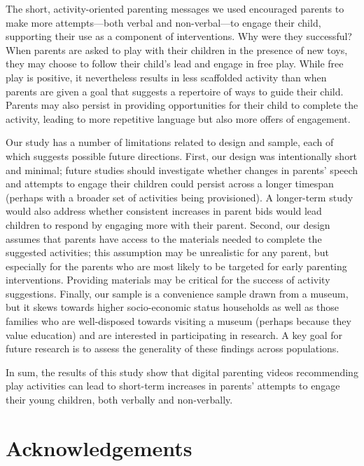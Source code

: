 \documentclass[man,floatsintext]{apa6}
\begin{document}
The short, activity-oriented parenting messages we used encouraged parents to make more attempts---both verbal and non-verbal---to engage their child, supporting their use as a component of interventions.
Why were they successful?
When parents are asked to play with their children in the presence of new toys, they may choose to follow their child's lead and engage in free play.
While free play is positive, it nevertheless results in less scaffolded activity than when parents are given a goal that suggests a repertoire of ways to guide their child.
Parents may also persist in providing opportunities for their child to complete the activity, leading to more repetitive language but also more offers of engagement.

Our study has a number of limitations related to design and sample, each of which suggests possible future directions.
First, our design was intentionally short and minimal; future studies should investigate whether changes in parents' speech and attempts to engage their children could persist across a longer timespan (perhaps with a broader set of activities being provisioned).
A longer-term study would also address whether consistent increases in parent bids would lead children to respond by engaging more with their parent.
Second, our design assumes that parents have access to the materials needed to complete the suggested activities; this assumption may be unrealistic for any parent, but especially for the parents who are most likely to be targeted for early parenting interventions.
Providing materials may be critical for the success of activity suggestions.
Finally, our sample is a convenience sample drawn from a museum, but it skews towards higher socio-economic status households as well as those families who are well-disposed towards visiting a museum (perhaps because they value education) and are interested in participating in research.
A key goal for future research is to assess the generality of these findings across populations.

In sum, the results of this study show that digital parenting videos recommending play activities can lead to short-term increases in parents' attempts to engage their young children, both verbally and non-verbally.

\hypertarget{acknowledgements}{%
\section{Acknowledgements}\label{acknowledgements}}
\end{document}
